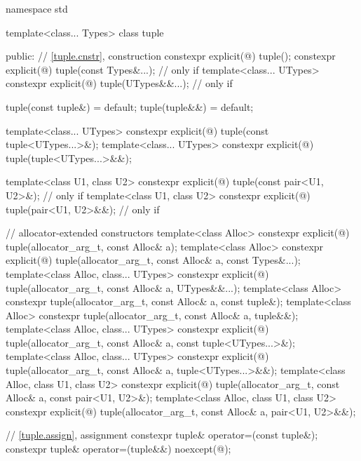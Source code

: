 \begin{codeblock}
namespace std {
  template<class... Types>
  class tuple {
  public:
    // \ref{tuple.cnstr},  construction
    constexpr explicit(@\seebelow@) tuple();
    constexpr explicit(@\seebelow@) tuple(const Types&...);         // only if 
    template<class... UTypes>
      constexpr explicit(@\seebelow@) tuple(UTypes&&...);           // only if 

    tuple(const tuple&) = default;
    tuple(tuple&&) = default;

    template<class... UTypes>
      constexpr explicit(@\seebelow@) tuple(const tuple<UTypes...>&);
    template<class... UTypes>
      constexpr explicit(@\seebelow@) tuple(tuple<UTypes...>&&);

    template<class U1, class U2>
      constexpr explicit(@\seebelow@) tuple(const pair<U1, U2>&);   // only if 
    template<class U1, class U2>
      constexpr explicit(@\seebelow@) tuple(pair<U1, U2>&&);        // only if 

    // allocator-extended constructors
    template<class Alloc>
      constexpr explicit(@\seebelow@)
        tuple(allocator_arg_t, const Alloc& a);
    template<class Alloc>
      constexpr explicit(@\seebelow@)
        tuple(allocator_arg_t, const Alloc& a, const Types&...);
    template<class Alloc, class... UTypes>
      constexpr explicit(@\seebelow@)
        tuple(allocator_arg_t, const Alloc& a, UTypes&&...);
    template<class Alloc>
      constexpr tuple(allocator_arg_t, const Alloc& a, const tuple&);
    template<class Alloc>
      constexpr tuple(allocator_arg_t, const Alloc& a, tuple&&);
    template<class Alloc, class... UTypes>
      constexpr explicit(@\seebelow@)
        tuple(allocator_arg_t, const Alloc& a, const tuple<UTypes...>&);
    template<class Alloc, class... UTypes>
      constexpr explicit(@\seebelow@)
        tuple(allocator_arg_t, const Alloc& a, tuple<UTypes...>&&);
    template<class Alloc, class U1, class U2>
      constexpr explicit(@\seebelow@)
        tuple(allocator_arg_t, const Alloc& a, const pair<U1, U2>&);
    template<class Alloc, class U1, class U2>
      constexpr explicit(@\seebelow@)
        tuple(allocator_arg_t, const Alloc& a, pair<U1, U2>&&);

    // \ref{tuple.assign},  assignment
    constexpr tuple& operator=(const tuple&);
    constexpr tuple& operator=(tuple&&) noexcept(@\seebelow@);

}}
\end{codeblock}

